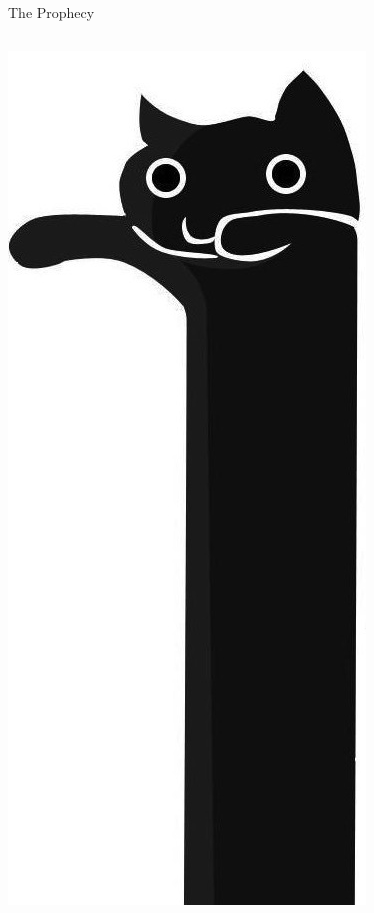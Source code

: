\documentclass{beamer}
\begin{document}
\begin{frame}[t]{The Prophecy}
\begin{columns}[T]
	\vspace{0em}
	\begin{flushright}
	\includegraphics[scale=.3]{images/longcat-black.jpg}		
	\end{flushright}
		
	\end{columns}
	\end{frame}
	
\end{document}
